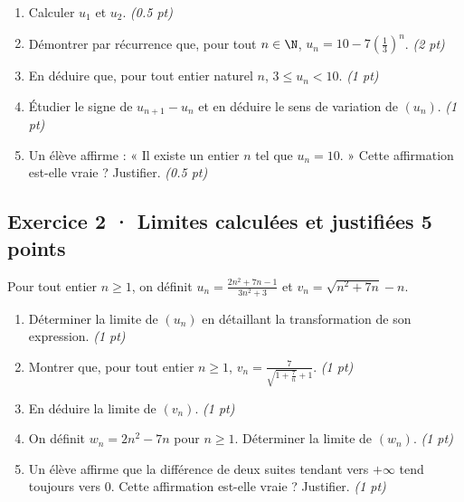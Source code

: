 \begin{enumerate}

\item Calculer $u_1$ et $u_2$. \hfill\textit{(\num{0,5} pt)}

\item Démontrer par récurrence que, pour tout $n\in\N$, $u_n=10-7\left(\frac{1}{3}\right)^n$. \hfill\textit{(2 pt)}

\item En déduire que, pour tout entier naturel $n$, $3\le u_n<10$. \hfill\textit{(1 pt)}

\item Étudier le signe de $u_{n+1}-u_n$ et en déduire le sens de variation de $(u_n)$. \hfill\textit{(1 pt)}

\item Un élève affirme : « Il existe un entier $n$ tel que $u_n=10$. » Cette affirmation est-elle vraie ? Justifier. \hfill\textit{(\num{0,5} pt)}

\end{enumerate}

\subsection*{Exercice 2 · Limites calculées et justifiées \hfill 5 points}Pour tout entier $n\ge1$, on définit $u_n=\frac{2n^2+7n-1}{3n^2+3}$ et $v_n=\sqrt{n^2+7n}-n$.

\begin{enumerate}

\item Déterminer la limite de $(u_n)$ en détaillant la transformation de son expression. \hfill\textit{(1 pt)}

\item Montrer que, pour tout entier $n\ge1$, $v_n=\frac{7}{\sqrt{1+\frac{7}n}+1}$. \hfill\textit{(1 pt)}

\item En déduire la limite de $(v_n)$. \hfill\textit{(1 pt)}

\item On définit $w_n=2n^2-7n$ pour $n\ge1$. Déterminer la limite de $(w_n)$. \hfill\textit{(1 pt)}

\item Un élève affirme que la différence de deux suites tendant vers $+\infty$ tend toujours vers $0$. Cette affirmation est-elle vraie ? Justifier. \hfill\textit{(1 pt)}

\end{enumerate}

